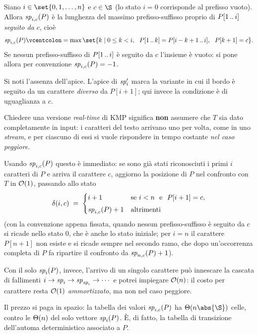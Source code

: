 \begin{definizione}[$\spv{i,c}(P)$]\label{def:sp-ic}
  Siano $i\in\set{0,1,\dots,n}$ e $c\in\alfa$ (lo stato $i=0$ corrisponde al
  prefisso vuoto). Allora $\spv{i,c}(P)$ è la lunghezza del massimo
  prefisso-suffisso proprio di $P[1\,..\,i]$ \emph{seguito da $c$}, cioè
  \[
    \spv{i,c}(P) \defeq \max\set{k \mid 0\le k<i,\ \ \pre{P}{k}=\sub{P}{i-k+1}{i},\ \ P[k+1]=c} .
  \]
  Se nessun prefisso-suffisso di $P[1\,..\,i]$ è seguito da $c$ l'insieme è vuoto:
  si pone allora per convenzione $\mathit{sp}_{i,c}(P)=-1$.
\end{definizione}

\noindent Si noti l'assenza dell'apice. L'apice di $\mathit{sp}'_{i}$ marca la variante in
cui il bordo è seguito da un carattere \emph{diverso} da $P[i+1]$; qui invece la
condizione è di uguaglianza a $c$.

Chiedere una versione \emph{real-time} di KMP significa \textbf{non} assumere che
$T$ sia dato completamente in input: i caratteri del testo arrivano uno per
volta, come in uno \emph{stream}, e per ciascuno di essi si vuole rispondere in
tempo costante \emph{nel caso peggiore}.

Usando $\spv{i,c}(P)$ questo è immediato: se sono già stati riconosciuti i primi
$i$ caratteri di $P$ e arriva il carattere $c$, aggiorno la posizione di $P$ nel
confronto con $T$ in $\mathcal{O}(1)$, passando allo stato
\[
  \delta(i,c) \;=\;
  \begin{cases}
    i+1 & \text{se } i<n \ \text{ e } \ P[i+1]=c,\\[3pt]
    \mathit{sp}_{i,c}(P)+1 & \text{altrimenti}
  \end{cases}
\]
(con la convenzione appena fissata, quando nessun prefisso-suffisso è seguito da
$c$ si ricade nello stato $0$, che è anche lo stato iniziale; per $i=n$ il
carattere $P[n+1]$ non esiste e si ricade sempre nel secondo ramo, che dopo
un'occorrenza completa di $P$ fa ripartire il confronto da $\mathit{sp}_{n,c}(P)+1$).

Con il solo $\mathit{sp}_{i}(P)$, invece, l'arrivo di un singolo carattere può innescare
la cascata di fallimenti $i\to\mathit{sp}_{i}\to\mathit{sp}_{\mathit{sp}_{i}}\to\cdots$ e potrei
impiegare $\mathcal{O}(n)$: il costo per carattere resta $\mathcal{O}(1)$ \emph{ammortizzato},
ma non nel caso peggiore.

\begin{osservazione}
  Il prezzo si paga in spazio: la tabella dei valori $\spv{i,c}(P)$ ha
  $\Th(n\abs{\alfa})$ celle, contro le $\Theta(n)$ del solo vettore $\mathit{sp}_{i}(P)$. È,
  di fatto, la tabella di transizione dell'automa deterministico associato a $P$.
\end{osservazione}

